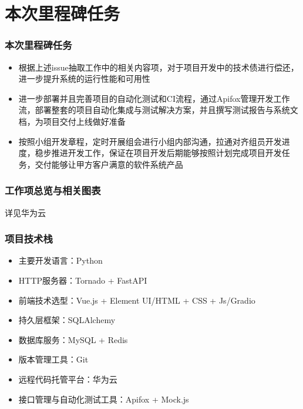 \section{本次里程碑任务}
\begin{frame}
    \frametitle{本次里程碑任务}
    \begin{itemize}
        \item 根据上述issue抽取工作中的相关内容项，对于项目开发中的技术债进行偿还，进一步提升系统的运行性能和可用性
        \item 进一步部署并且完善项目的自动化测试和CI流程，通过Apifox管理开发工作流，部署整套的项目自动化集成与测试解决方案，并且撰写测试报告与系统文档，为项目交付上线做好准备
        \item 按照小组开发章程，定时开展组会进行小组内部沟通，拉通对齐组员开发进度，稳步推进开发工作，保证在项目开发后期能够按照计划完成项目开发任务，交付能够让甲方客户满意的软件系统产品
    \end{itemize}
\end{frame}

\begin{frame}
    \frametitle{工作项总览与相关图表}
    详见华为云
\end{frame}

\begin{frame}
    \frametitle{项目技术栈}
    \begin{itemize}
        \item 主要开发语言：Python
        \item HTTP服务器：Tornado + FastAPI
        \item 前端技术选型：Vue.js + Element UI/HTML + CSS + Js/Gradio
        \item 持久层框架：SQLAlchemy
        \item 数据库服务：MySQL + Redis
        \item 版本管理工具：Git
        \item 远程代码托管平台：华为云
        \item 接口管理与自动化测试工具：Apifox + Mock.js
    \end{itemize}
\end{frame}